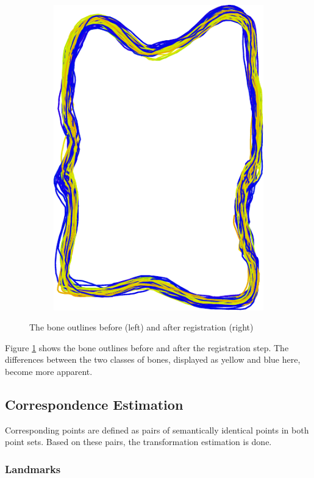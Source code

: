 \documentclass[pdftex,12pt,a4paper]{report}
\begin{document}
\begin{figure}[h]
\begin{subfigure}[b]{0.34\textwidth}
		\includegraphics[width=.9\linewidth]{img/registration/registered.pdf}
	\end{subfigure}
	\caption{The bone outlines before (left) and after registration (right)}
	\label{fig:registration}
\end{figure}

Figure \ref{fig:registration} shows the bone outlines before and after the registration step. The differences between the two classes of bones, displayed as yellow and blue here, become more apparent.

\subsection{Correspondence Estimation}

Corresponding points are defined as pairs of semantically identical points in both point sets. Based on these
pairs, the transformation estimation is done.

\subsubsection{Landmarks}
\end{document}

